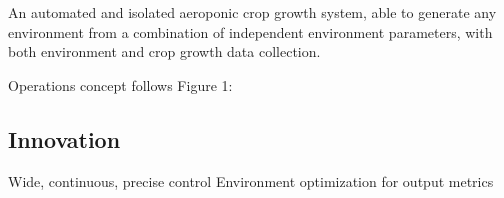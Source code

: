 \documentclass{report}
\begin{document}
An automated and isolated aeroponic crop growth system, able to generate any environment from a combination of independent environment parameters, with both environment and crop growth data collection.



Operations concept follows Figure 1:




\subsection{Innovation}
Wide, continuous, precise control
Environment optimization for output metrics
\end{document}

